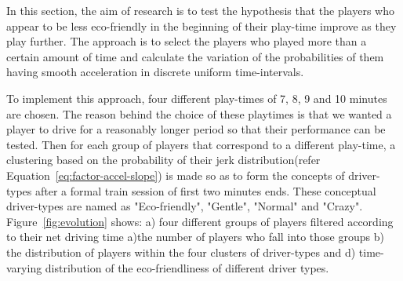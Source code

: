 \documentclass[preprint,authoryear,12pt]{elsarticle}
\begin{document}
In this section, the aim of research is to test the hypothesis that the players who appear to be less eco-friendly in the beginning of their play-time improve as they play further. The approach is to select the players who played more than a certain amount of time and calculate the variation of the probabilities of them having smooth acceleration in discrete uniform time-intervals. 

To implement this approach, four different play-times of 7, 8, 9 and 10 minutes are chosen. The reason behind the choice of these playtimes is that we wanted a player to drive for a reasonably longer period so that their performance can be tested. Then for each group of players that correspond to a different play-time, a clustering based on the probability of their jerk distribution(refer Equation~\ref{eq:factor-accel-slope}) is made so as to form the concepts of driver-types after a formal train session of first two minutes ends. These conceptual driver-types are named as "Eco-friendly", "Gentle", "Normal" and "Crazy". Figure~\ref{fig:evolution} shows: a) four different groups of players filtered according to their net driving time  a)the number of players who fall into those groups b) the distribution of players within the four clusters of driver-types and d) time-varying distribution of the eco-friendliness of different driver types. 
\end{document}
